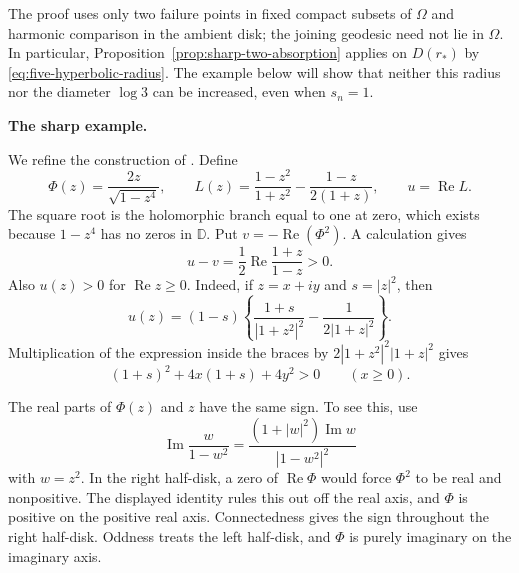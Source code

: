 \documentclass[12pt,letterpaper,reqno]{amsart}
\theoremstyle{definition}
\numberwithin{equation}{section}
\newcommand{\D}{\mathbb D}
\DeclareMathOperator{\Rea}{Re}
\DeclareMathOperator{\Ima}{Im}
\begin{document}
	The proof uses only two failure points in fixed compact subsets of
	$\Omega$ and harmonic comparison in the ambient disk; the joining
	geodesic need not lie in $\Omega$.
	In particular, Proposition~\ref{prop:sharp-two-absorption} applies
	on $D(r_*)$ by \eqref{eq:five-hyperbolic-radius}. The example below
	will show that neither this radius nor the diameter $\log3$ can be
	increased, even when $s_n=1$.
	
	\medskip\noindent\textbf{The sharp example.}
	
	We refine the construction of \cite[Section~4]{Ere96b}.
	Define
	\begin{equation*}
		\Phi(z)=\frac{2z}{\sqrt{1-z^4}},
		\qquad
		L(z)=\frac{1-z^2}{1+z^2}-\frac{1-z}{2(1+z)},
		\qquad u=\Rea L.
	\end{equation*}
	The square root is the holomorphic branch equal to one at zero,
	which exists because $1-z^4$ has no zeros in $\D$. Put
	$v=-\Rea(\Phi^2)$. A calculation gives
	\begin{equation}\label{eq:five-majorant-identity}
		u-v=\frac12\Rea\frac{1+z}{1-z}>0.
	\end{equation}
	Also $u(z)>0$ for $\Rea z\ge0$. Indeed, if $z=x+iy$ and $s=|z|^2$,
	then
	\[
	u(z)=(1-s)
	\left\{\frac{1+s}{|1+z^2|^2}
	-\frac1{2|1+z|^2}\right\}.
	\]
	Multiplication of the expression inside the braces by
	$2|1+z^2|^2|1+z|^2$ gives
	\[
	(1+s)^2+4x(1+s)+4y^2>0
	\qquad(x\ge0).
	\]
	
	The real parts of $\Phi(z)$ and $z$ have the same sign. To see this,
	use
	\[
	\Ima\frac{w}{1-w^2}
	=\frac{(1+|w|^2)\Ima w}{|1-w^2|^2}
	\]
	with $w=z^2$. In the right half-disk, a zero of $\Rea\Phi$ would force
	$\Phi^2$ to be real and nonpositive. The displayed identity rules
	this out off the real axis, and $\Phi$ is positive on the positive
	real axis. Connectedness gives the sign throughout the right
	half-disk. Oddness treats the left half-disk, and $\Phi$ is purely
	imaginary on the imaginary axis.
	
\end{document}
